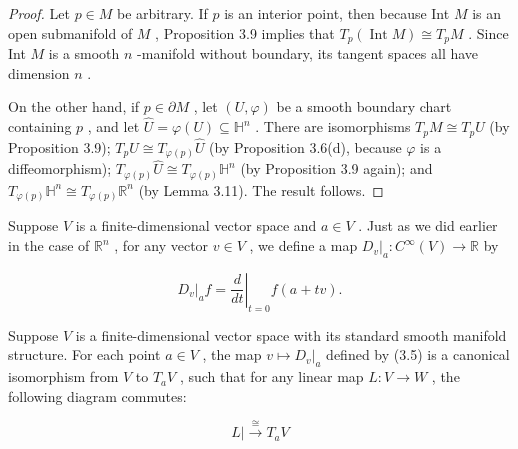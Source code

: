 \begin{proof}
\leanok
Let $p \in  M$ be arbitrary. If $p$ is an interior point, then because Int $M$ is an open submanifold of $M$ , Proposition 3.9 implies that ${T}_{p}\left( {\operatorname{Int}M}\right)  \cong  {T}_{p}M$ . Since Int $M$ is a smooth $n$ -manifold without boundary, its tangent spaces all have dimension $n$ .

On the other hand, if $p \in  \partial M$ , let $\left( {U,\varphi }\right)$ be a smooth boundary chart containing $p$ , and let $\widehat{U} = \varphi \left( U\right)  \subseteq  {\mathbb{H}}^{n}$ . There are isomorphisms ${T}_{p}M \cong  {T}_{p}U$ (by Proposition 3.9); ${T}_{p}U \cong  {T}_{\varphi \left( p\right) }\widehat{U}$ (by Proposition 3.6(d), because $\varphi$ is a diffeomorphism); ${T}_{\varphi \left( p\right) }\widehat{U} \cong  {T}_{\varphi \left( p\right) }{\mathbb{H}}^{n}$ (by Proposition 3.9 again); and ${T}_{\varphi \left( p\right) }{\mathbb{H}}^{n} \cong  {T}_{\varphi \left( p\right) }{\mathbb{R}}^{n}$ (by Lemma 3.11). The result follows.
\end{proof}

\begin{definition}
\label{def:3-14-extra-2}
\mathlibok
Suppose $V$ is a finite-dimensional vector space and $a \in  V$ . Just as we did earlier in the case of ${\mathbb{R}}^{n}$ , for any vector $v \in  V$ , we define a map ${\left. {D}_{v}\right| }_{a} : {C}^{\infty }\left( V\right)  \rightarrow  \mathbb{R}$ by

\[
{\left. {D}_{v}\right| }_{a}f = {\left. \frac{d}{dt}\right| }_{t = 0}f\left( {a + {tv}}\right) . \tag{3.5}
\]
\end{definition}

\begin{proposition}
\label{prop:3-13}
\leanok
{}
Suppose $V$ is a finite-dimensional vector space with its standard smooth manifold structure. For each point $a \in  V$ , the map $v \mapsto  {\left. {D}_{v}\right| }_{a}$ defined by (3.5) is a canonical isomorphism from $V$ to ${T}_{a}V$ , such that for any linear map $L : V \rightarrow  W$ , the following diagram commutes:

\[
L|\xrightarrow[]{ \cong  }{T}_{a}V \tag{3.6}
\]
\end{proposition}

